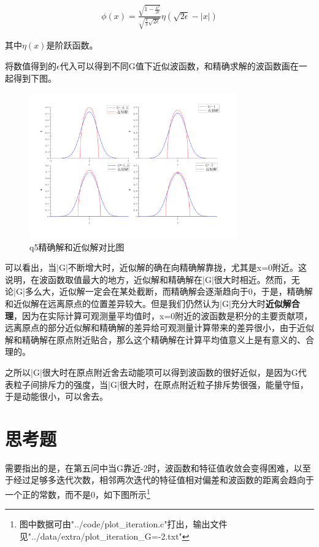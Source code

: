 \documentclass[10pt, a4paper]{article}
\begin{document}
    \begin{align*}
      \phi(x)=\frac{\sqrt{1-\frac{x^2}{2\epsilon}}}{\sqrt{\frac{4}{3}\sqrt{2\epsilon}}}\eta(\sqrt{2\epsilon}-|x|)
    \end{align*}

    其中$\eta(x)$是阶跃函数。

    将数值得到的$\epsilon$代入可以得到不同G值下近似波函数，和精确求解的波函数画在一起得到下图。

    \begin{figure}[H]
      \centering
      \includegraphics[width=0.8\textwidth]{q5精确解和近似解对比图.jpg}
      \caption{q5精确解和近似解对比图}\label{fig:q5精确解和近似解对比图}
    \end{figure}

    可以看出，当|G|不断增大时，近似解的确在向精确解靠拢，尤其是x=0附近。这说明，在波函数取值最大的地方，近似解和精确解在|G|很大时相近。然而，无论|G|多么大，近似解一定会在某处截断，而精确解会逐渐趋向于0，于是，精确解和近似解在远离原点的位置差异较大。但是我们仍然认为|G|充分大时\textbf{近似解合理}，因为在实际计算可观测量平均值时，x=0附近的波函数是积分的主要贡献项，远离原点的部分近似解和精确解的差异给可观测量计算带来的差异很小，由于近似解和精确解在原点附近贴合，那么这个精确解在计算平均值意义上是有意义的、合理的。

    之所以|G|很大时在原点附近舍去动能项可以得到波函数的很好近似，是因为G代表粒子间排斥力的强度，当|G|很大时，在原点附近粒子排斥势很强，能量守恒，于是动能很小，可以舍去。

    \section{思考题}

    需要指出的是，在第五问中当G靠近-2时，波函数和特征值收敛会变得困难，以至于经过足够多迭代次数，相邻两次迭代的特征值相对偏差和波函数的距离会趋向于一个正的常数，而不是0，如下图所示\footnote{图中数据可由"../code/plot_iteration.c"打出，输出文件见"../data/extra/plot_iteration_G=-2.txt"}
\end{document}
